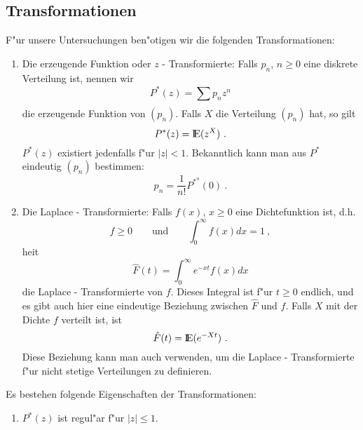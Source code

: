 \begin{appendix}
\chapter{Transformationen}
F"ur unsere Untersuchungen ben"otigen wir die folgenden Transformationen:
\begin{enumerate}
\item Die erzeugende Funktion oder $z$ - Transformierte: Falls $p_{n}$, $n
\geq 0$ eine diskrete Verteilung ist, nennen wir
\begin{displaymath}
P^{*}(z) = \sum_{}^{} p_{n} z^{n}
\end{displaymath}
die erzeugende Funktion von $(p_{n})$. Falls $X$ die Verteilung $(p_{n})$
hat, so gilt
\begin{displaymath}
P^{*}(z) = {\rm I\kern-0.2em E} (z^{X}) ~.
\end{displaymath}  
$P^{*}(z)$ existiert jedenfalls f"ur $|z|<1$. Bekanntlich kann man aus 
$P^{*}$ eindeutig $(p_{n})$ bestimmen:
\begin{displaymath}
p_{n} = \frac{1}{n!} P^{*^{n}} (0) ~.
\end{displaymath}
\item Die Laplace - Transformierte: Falls $f(x)$, $x \geq 0$ eine
Dichtefunktion ist, d.h.
\begin{displaymath}
f \geq 0 \qquad \mbox{und} \qquad \int_{0}^{\infty} f(x)dx = 1 ~,
\end{displaymath}
hei\3t
\begin{displaymath}
\hat F(t) = \int_{0}^{\infty} e^{-xt} f(x)dx
\end{displaymath}
die Laplace - Transformierte von $f$. Dieses Integral ist f"ur $t \geq 0$
endlich, und es gibt auch hier eine eindeutige Beziehung zwischen $\hat F$
und $f$. Falls $X$ mit der Dichte $f$ verteilt ist, ist
\begin{displaymath}
\hat F(t) = {\rm I\kern-0.2em E} (e^{-Xt}) ~.
\end{displaymath}
Diese Beziehung kann man auch verwenden, um die Laplace - Transformierte
f"ur nicht stetige Verteilungen zu definieren.
\end{enumerate}    
Es bestehen folgende Eigenschaften der Transformationen:
\begin{enumerate}
\item $P^{*}(z)$ ist regul"ar f"ur $|z| \leq 1$.

\end{enumerate}
\end{appendix}
